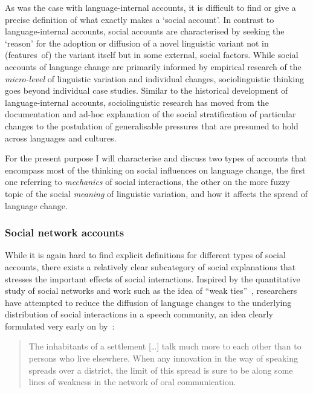 As was the case with language-internal accounts, it is difficult to find or give a precise definition of what exactly makes a `social account'. In contrast to language-internal accounts, social accounts are characterised by seeking the `reason' for the adoption or diffusion of a novel linguistic variant not in (features~of) the variant itself but in some external, social factors.
While social accounts of language change are primarily informed by empirical research of the \emph{micro-level} of linguistic variation and individual changes, sociolinguistic thinking goes beyond individual case studies.
Similar to the historical development of language-internal accounts, sociolinguistic research %
has moved from the documentation and ad-hoc explanation of the social stratification of particular changes to the postulation of generalisable pressures that are presumed to hold across languages and cultures.

For the present purpose I will characterise and discuss two types of accounts that encompass most of the thinking on social influences on language change, the first one referring to \emph{mechanics} of social interactions, the other on the more fuzzy topic of the social \emph{meaning} of linguistic variation, and how it affects the spread of language change.

\subsubsection{Social network accounts}
\label{sec:interactorselection}

While it is again hard to find explicit definitions for different types of social accounts, there exists a relatively clear subcategory of social explanations that stresses the important effects of social interactions. 
Inspired by the quantitative study of social networks and work such as the idea of ``weak ties''~\citep{Granovetter1973}, researchers have attempted to reduce the diffusion of language changes to the underlying distribution of social interactions in a speech community, an idea clearly formulated very early on by~\citet[p.476]{Bloomfield1933}:

\begin{quote}
The inhabitants of a settlement [\ldots] talk much more to each other than to persons who live elsewhere. When any innovation in the way of speaking spreads over a district, the limit of this spread is sure to be along some lines of weakness in the network of oral communication.
\end{quote}

